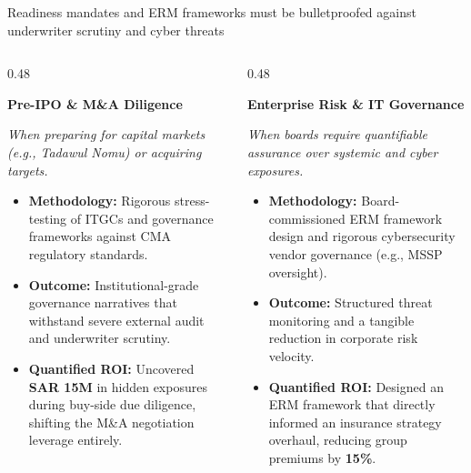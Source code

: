 \documentclass[aspectratio=169, 10pt]{beamer}
\begin{document}
\begin{frame}{Readiness mandates and ERM frameworks must be bulletproofed against underwriter scrutiny and cyber threats}
    \vspace{0.3cm}
    \begin{columns}[T]
        \begin{column}{0.48\textwidth}
            \begin{tcolorbox}[colback=bcgLightGray, colframe=bcgLightGray, arc=0pt, left=5pt, top=5pt, bottom=5pt]
                \textbf{\large \color{bcgGreen} Pre-IPO \& M\&A Diligence}
            \end{tcolorbox}
            \textit{\color{gray} When preparing for capital markets (e.g., Tadawul Nomu) or acquiring targets.}
            \vspace{0.2cm}
            \begin{itemize}
                \item \textbf{Methodology:} Rigorous stress-testing of ITGCs and governance frameworks against CMA regulatory standards.
                \item \textbf{Outcome:} Institutional-grade governance narratives that withstand severe external audit and underwriter scrutiny.
                \item \textbf{\color{bcgGreen} Quantified ROI:} Uncovered \textbf{SAR 15M} in hidden exposures during buy-side due diligence, shifting the M\&A negotiation leverage entirely.
            \end{itemize}
        \end{column}
        
        \begin{column}{0.48\textwidth}
            \begin{tcolorbox}[colback=bcgLightGray, colframe=bcgLightGray, arc=0pt, left=5pt, top=5pt, bottom=5pt]
                \textbf{\large \color{bcgGreen} Enterprise Risk \& IT Governance}
            \end{tcolorbox}
            \textit{\color{gray} When boards require quantifiable assurance over systemic and cyber exposures.}
            \vspace{0.2cm}
            \begin{itemize}
                \item \textbf{Methodology:} Board-commissioned ERM framework design and rigorous cybersecurity vendor governance (e.g., MSSP oversight).
                \item \textbf{Outcome:} Structured threat monitoring and a tangible reduction in corporate risk velocity.
                \item \textbf{\color{bcgGreen} Quantified ROI:} Designed an ERM framework that directly informed an insurance strategy overhaul, reducing group premiums by \textbf{15\%}.
            \end{itemize}
        \end{column}
    \end{columns}
\end{frame}
\end{document}
